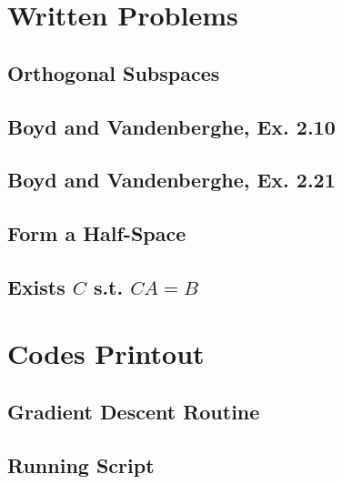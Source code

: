 \documentclass[11pt,a4paper]{article}
\begin{document}
\newpage
\section{Written Problems}
\subsection{Orthogonal Subspaces}
\subsection{Boyd and Vandenberghe, Ex. 2.10}
\subsection{Boyd and Vandenberghe, Ex. 2.21}
\subsection{Form a Half-Space}
\subsection{Exists $C$ s.t. $CA = B$}

\newpage
\appendix
\section{Codes Printout}

\subsection{Gradient Descent Routine}

\newpage

\subsection{Running Script}


\end{document}
